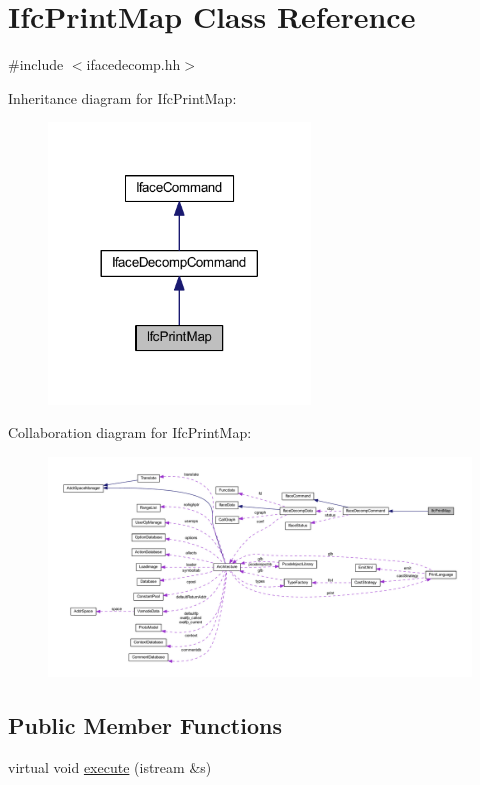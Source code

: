 \hypertarget{class_ifc_print_map}{}\section{Ifc\+Print\+Map Class Reference}
\label{class_ifc_print_map}


{\ttfamily \#include $<$ifacedecomp.\+hh$>$}



Inheritance diagram for Ifc\+Print\+Map\+:
\nopagebreak
\begin{figure}[H]
\begin{center}
\leavevmode
\includegraphics[width=197pt]{class_ifc_print_map__inherit__graph}
\end{center}
\end{figure}


Collaboration diagram for Ifc\+Print\+Map\+:
\nopagebreak
\begin{figure}[H]
\begin{center}
\leavevmode
\includegraphics[width=350pt]{class_ifc_print_map__coll__graph}
\end{center}
\end{figure}
\subsection*{Public Member Functions}
\begin{DoxyCompactItemize}
\item 
virtual void \mbox{\hyperlink{class_ifc_print_map_a5508ed1c8729f4e1d5172e5275423b59}{execute}} (istream \&s)
\end{DoxyCompactItemize}

